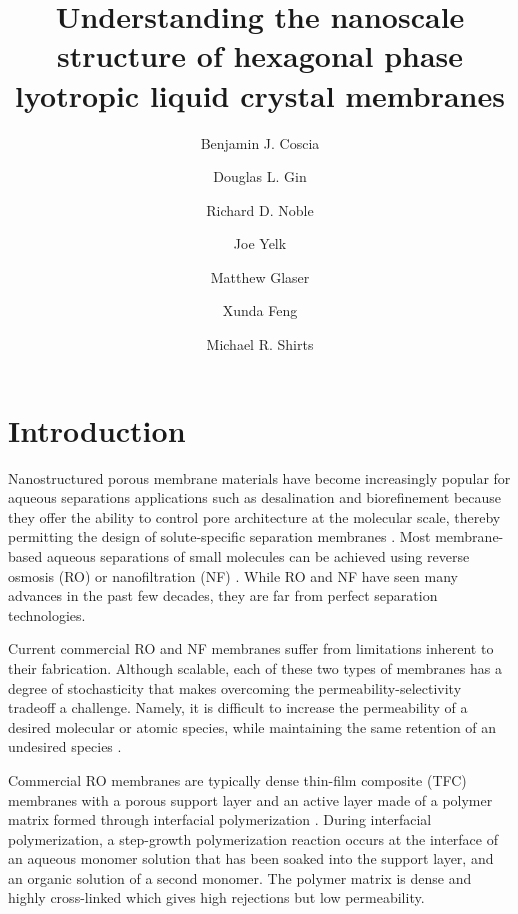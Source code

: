 \documentclass{article}
\title{Understanding the nanoscale structure of hexagonal phase
lyotropic liquid crystal membranes}
\author{Benjamin J. Coscia \and Douglas L. Gin \and Richard D. Noble
\and Joe Yelk \and Matthew Glaser \and Xunda Feng \and Michael R.
Shirts}
\begin{document}
  
  \graphicspath{{./figures/}}
  \maketitle

  \section{Introduction}
  
  Nanostructured porous membrane materials have become increasingly popular for
  aqueous separations applications such as desalination and biorefinement because
  they offer the ability to control pore architecture at the molecular scale,
  thereby permitting the design of solute-specific separation membranes
  \cite{humplik_nanostructured_2011}. Most membrane-based aqueous separations of
  small molecules can be achieved using reverse osmosis (RO) or nanofiltration
  (NF) \cite{van_der_bruggen_review_2003}. While RO and NF have seen many
  advances in the past few decades, they are far from perfect separation
  technologies. 

  Current commercial RO and NF membranes suffer from limitations inherent to
  their fabrication. Although scalable, each of these two types of membranes has
  a degree of stochasticity that makes overcoming the permeability-selectivity
  tradeoff a challenge.  Namely, it is difficult to increase the permeability of
  a desired molecular or atomic species, while maintaining the same retention of
  an undesired species \cite{werber_materials_2016}. 

 

  Commercial RO membranes are typically dense thin-film composite (TFC)
  membranes with a porous support layer and an active layer made of a polymer
  matrix formed through interfacial polymerization \cite{jeong_interfacial_2007}.
  During interfacial polymerization, a step-growth polymerization reaction occurs
  at the interface of an aqueous monomer solution that has been soaked into the
  support layer, and an organic solution of a second monomer. The polymer matrix
  is dense and highly cross-linked which gives high rejections but low
  permeability. 
\end{document}
